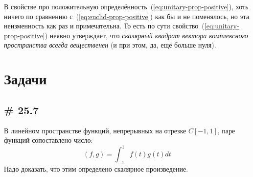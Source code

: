\documentclass[a4paper,12pt]{article}
\begin{document}
  В свойстве про положительную определённость~(\ref{eq:unitary-prop-positive}), хоть ничего по сравнению с~(\ref{eq:euclid-prop-positive}) как бы и не поменялось, но эта неизменность как раз и примечательна.
  То есть по сути свойство~(\ref{eq:unitary-prop-positive}) неявно утверждает, что \emph{скалярный квадрат вектора комплексного пространства всегда вещественен} (и при этом, да, ещё больше нуля).
  
  
  \section{Задачи}
  
  \subsection{\# 25.7}
  
  В линейном пространстве функций, непрерывных на отрезке $C[-1, 1]$, паре функций сопоставлено число:
  \[
    (f, g) = \int_{-1}^{1} f(t) g(t) dt
  \]
  Надо доказать, что этим определено скалярное произведение.
  
\end{document}
